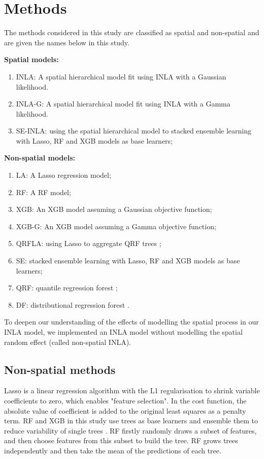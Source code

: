 \documentclass{article}
\begin{document}
\section {Methods}

The methods considered in this study are classified as spatial and non-spatial and are given the names below in this study. 

\noindent\textbf{Spatial models:}
\begin{enumerate}
\item INLA: A spatial hierarchical model fit using INLA with a Gaussian likelihood.  
\item INLA-G: A spatial hierarchical model fit using INLA with a Gamma likelihood. 
\item SE-INLA: using the spatial hierarchical model to stacked ensemble learning with Lasso, RF and XGB models as base learners;
\end{enumerate}

\noindent\textbf{Non-spatial models:}
\begin{enumerate}
\item LA: A Lasso regression model; 
\item RF: A RF model; 
\item XGB: An XGB model assuming a Gaussian objective function; 
\item XGB-G: An XGB model assuming a Gamma objective function; 
\item QRFLA: using Lasso to aggregate QRF trees \citep{hastie2009elements};
\item SE: stacked ensemble learning with Lasso, RF and XGB models as base learners; 
\item QRF: quantile regression forest \citep{meinshausen2006quantile};
\item DF: distributional regression forest \citep{schlosser2019distributional}.
\end{enumerate}

To deepen our understanding of the effects of modelling the spatial process in our INLA model, we implemented an INLA model without modelling the spatial random effect (called non-spatial INLA). 

\noindent\subsection{Non-spatial methods}
Lasso is a linear regression algorithm with the L1 regularisation to shrink variable coefficients to zero, which enables "feature selection". In the cost function, the absolute value of coefficient is added to the original least squares as a penalty term. RF and XGB in this study use trees as base learners and ensemble them to reduce variability of single trees \citep{friedman2001greedy}. RF firstly randomly draws a subset of features, and then choose features from this subset to build the tree. RF \citep{breiman2001random} grows trees independently and then take the mean of the predictions of each tree. 
\end{document}
